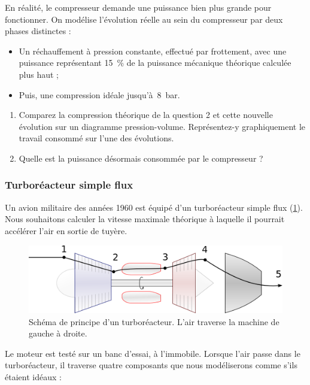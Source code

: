 	En réalité, le compresseur demande une puissance bien plus grande pour fonctionner. On modélise l’évolution réelle au sein du compresseur par deux phases distinctes : 

	\begin{itemize}
		\item Un réchauffement à pression constante, effectué par frottement, avec une puissance représentant \SI{15}{\percent} de la puissance mécanique théorique calculée plus haut ; 
		\item Puis, une compression idéale jusqu’à~\SI{8}{\bar}.
	\end{itemize}
	
	\begin{enumerate}
		\item Comparez la compression théorique de la question 2 et cette nouvelle évolution sur un diagramme pression-volume. Représentez-y graphiquement le travail consommé sur l’une des évolutions.
		\item Quelle est la puissance désormais consommée par le compresseur ?
	\end{enumerate}
	

\subsubsection{Turboréacteur simple flux}

	Un avion militaire des années 1960 est équipé d’un turboréacteur simple flux (\cref{fig_exo_turbojet}). Nous souhaitons calculer la vitesse maximale théorique à laquelle il pourrait accélérer l’air en sortie de tuyère.
	
	\begin{figure}
		\begin{center}
			\includegraphics[width=\textwidth]{images/turbojet.png}
		\end{center}
		\caption{Schéma de principe d’un turboréacteur. L’air traverse la machine de gauche à droite.}
		\label{fig_exo_turbojet}
	\end{figure}
	
	Le moteur est testé sur un banc d’essai, à l’immobile. Lorsque l’air passe dans le turboréacteur, il traverse quatre composants que nous modéliserons comme s’ils étaient idéaux :
	
